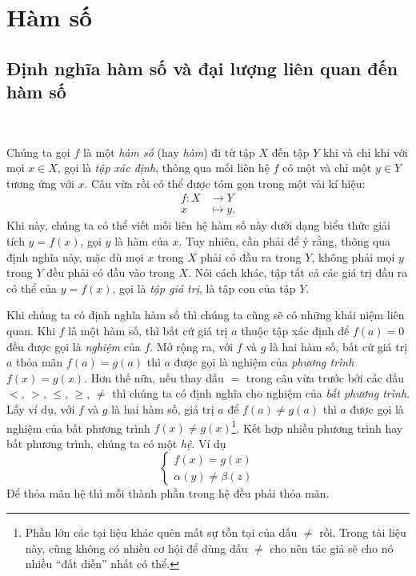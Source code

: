 \documentclass[a4paper, titlepage, openany]{book}
\newcommand\dblquote[1]{\textquotedblleft #1\textquotedblright}
\begin{document}
\section{Hàm số}

\subsection{Định nghĩa hàm số và đại lượng liên quan đến hàm số}

\ %

Chúng ta gọi $f$ là một \emph{hàm số} (hay \emph{hàm}) đi từ tập $X$ đến tập $Y$ khi và chỉ khi với mọi $x\in X$, gọi là \emph{tập xác định}, thông qua mối liên hệ $f$ có một và chỉ một $y\in Y$ tương ứng với $x$. Câu vừa rồi có thể được tóm gọn trong một vài kí hiệu: \begin{align*}f: X &\to Y \\ x &\mapsto y.\end{align*} Khi này, chúng ta có thể viết mối liên hệ hàm số này dưới dạng biểu thức giải tích $y=f(x)$, gọi $y$ là hàm của $x$. Tuy nhiên, cần phải để ý rằng, thông qua định nghĩa này, mặc dù mọi $x$ trong $X$ phải có đầu ra trong $Y$, không phải mọi $y$ trong $Y$ đều phải có đầu vào trong $X$. Nói cách khác, tập tất cả các giá trị đầu ra có thể của $y=f(x)$, gọi là \emph{tập giá trị}, là tập con của tập $Y$.

Khi chúng ta có định nghĩa hàm số thì chúng ta cũng sẽ có những khái niệm liên quan. Khi $f$ là một hàm số, thì bất cứ giá trị $a$ thuộc tập xác định để $f(a) = 0$ đều được gọi là \emph{nghiệm} của $f$. Mở rộng ra, với $f$ và $g$ là hai hàm số, bất cứ giá trị $a$ thỏa mãn $f(a) = g(a)$ thì $a$ được gọi là nghiệm của \emph{phương trình} $f(x) = g(x)$. Hơn thế nữa, nếu thay dấu $=$ trong câu vừa trước bởi các dấu $<$, $>$, $\leq$, $\geq$, $\neq$ thì chúng ta có định nghĩa cho nghiệm của \emph{bất phương trình}. Lấy ví dụ, với $f$ và $g$ là hai hàm số, giá trị $a$ để $f(a) \neq g(a)$ thì $a$ được gọi là nghiệm của bất phương trình $f(x) \neq g(x)$\footnote{Phần lớn các tại liệu khác quên mất sự tồn tại của dấu $\neq$ rồi. Trong tài liệu này, cũng không có nhiều cơ hội để dùng dấu $\neq$ cho nên tác giả sẽ cho nó nhiều \dblquote{đất diễn} nhất có thể.}. Kết hợp nhiều phương trình hay bất phương trình, chúng ta có một \emph{hệ}. Ví dụ 
$$
\begin{cases}
   f(x) = g(x) \\
   \alpha(y) \neq \beta(z)
\end{cases}
$$
Để thỏa mãn hệ thì mỗi thành phần trong hệ đều phải thỏa mãn.
\end{document}
